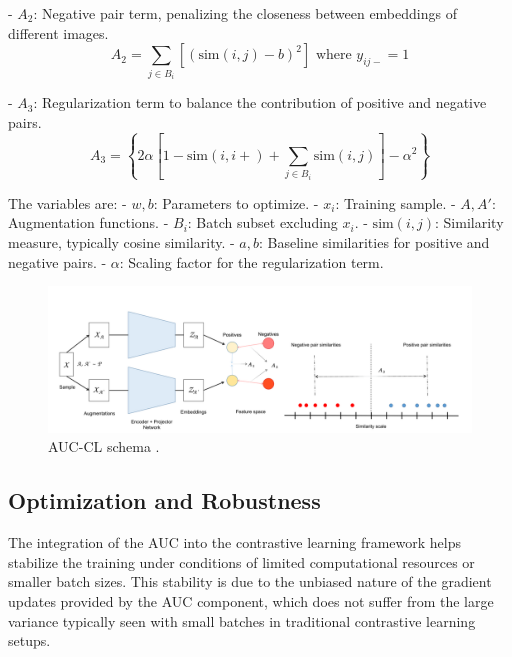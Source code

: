 - \(A_2\): Negative pair term, penalizing the closeness between embeddings of different images.
  \[
  A_2 = \sum_{j \in B_i} \left[ (\text{sim}(i, j) - b)^2 \right] \text{ where } y_{ij-} = 1
  \]

- \(A_3\): Regularization term to balance the contribution of positive and negative pairs.
  \[
  A_3 = \left\{ 2\alpha \left[ 1 - \text{sim}(i, i+) + \sum_{j \in B_i} \text{sim}(i, j) \right] - \alpha^2 \right\}
  \]

The variables are:
- \(w, b\): Parameters to optimize.
- \(x_i\): Training sample.
- \(A, A'\): Augmentation functions.
- \(B_i\): Batch subset excluding \(x_i\).
- \(\text{sim}(i, j)\): Similarity measure, typically cosine similarity.
- \(a, b\): Baseline similarities for positive and negative pairs.
- \(\alpha\): Scaling factor for the regularization term.


\begin{figure}[hbt]
\centering
\includegraphics[width=\textwidth]{figs/auc-cl.png}
\caption{
AUC-CL schema \cite{sharma2023auc}.
}
\label{fig:secex}
\end{figure}

\subsection{Optimization and Robustness}
The integration of the AUC into the contrastive learning framework helps stabilize the training under conditions of limited computational resources or smaller batch sizes. This stability is due to the unbiased nature of the gradient updates provided by the AUC component, which does not suffer from the large variance typically seen with small batches in traditional contrastive learning setups.
